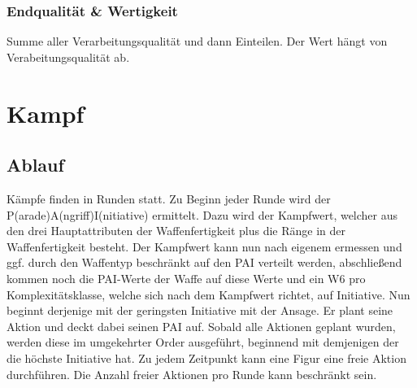 \documentclass[a4paper,12pt,oneside]{book}
\begin{document}
\section{Endqualität \& Wertigkeit}
Summe aller Verarbeitungsqualität und dann Einteilen. Der Wert hängt von Verabeitungsqualität ab.
\part{Kampf}
\setcounter{chapter}{0}
\chapter{Ablauf}

Kämpfe finden in Runden statt. Zu Beginn jeder Runde wird der P(arade)A(ngriff)I(nitiative) ermittelt. Dazu wird der Kampfwert, welcher aus den drei Hauptattributen der Waffenfertigkeit plus die Ränge in der Waffenfertigkeit besteht. Der Kampfwert kann nun nach eigenem ermessen und ggf. durch den Waffentyp beschränkt auf den PAI verteilt werden, abschließend kommen noch die PAI-Werte der Waffe auf diese Werte und ein W6 pro Komplexitätsklasse, welche sich nach dem Kampfwert richtet, auf Initiative. Nun beginnt derjenige mit der geringsten Initiative mit der Ansage. Er plant seine Aktion und deckt dabei seinen PAI auf. Sobald alle Aktionen geplant wurden, werden diese im umgekehrter Order ausgeführt, beginnend mit demjenigen der die höchste Initiative hat. Zu jedem Zeitpunkt kann eine Figur eine freie Aktion durchführen. Die Anzahl freier Aktionen pro Runde kann beschränkt sein.
\end{document}
